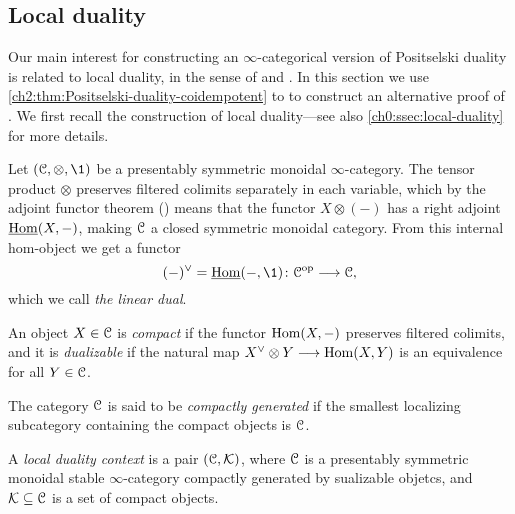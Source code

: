 

\subsection{Local duality}
\label{ch2:ssec:local-duality}

Our main interest for constructing an $\infty$-categorical version of Positselski duality is related to local duality, in the sense of \cite{hovey-palmiery-strickland_97} and \cite{barthel-heard-valenzuela_2018}. In this section we use \cref{ch2:thm:Positselski-duality-coidempotent} to to construct an alternative proof of \cite[2.21]{barthel-heard-valenzuela_2018}. We first recall the construction of local duality---see also \cref{ch0:ssec:local-duality} for more details. 

Let $(\C, \otimes, \1)$ be a presentably symmetric monoidal $\infty$-category. The tensor product $\otimes$ preserves filtered colimits separately in each variable, which by the adjoint functor theorem (\cite[5.5.2.9]{lurie_09}) means that the functor $X\otimes (-)$ has a right adjoint $\operatorname{\underline{Hom}}(X, -)$, making $\EuScript{C}$ a closed symmetric monoidal category. From this internal hom-object we get a functor 
\[(-)^\vee = \iHom(-, \1)\: \C\op \to \C,\] 
which we call \emph{the linear dual}. 

\begin{definition}
    An object $X\in \EuScript{C}$ is \emph{compact} if the functor $\operatorname{Hom}(X, -)$ preserves filtered colimits, and it is \emph{dualizable} if the natural map $X^\vee \otimes Y \longrightarrow \operatorname{Hom}(X,Y)$ is an equivalence for all $Y\in \EuScript{C}$. 
\end{definition}

The category $\EuScript{C}$ is said to be \emph{compactly generated} if the smallest localizing subcategory containing the compact objects is $\EuScript{C}$. 

\begin{definition}
    A \emph{local duality context} is a pair $(\EuScript{C}, \mathcal{K})$, where $\EuScript{C}$ is a presentably symmetric monoidal stable $\infty$-category compactly generated by sualizable objetcs, and $\mathcal{K}\subseteq \EuScript{C}$ is a set of compact objects. 
\end{definition}

